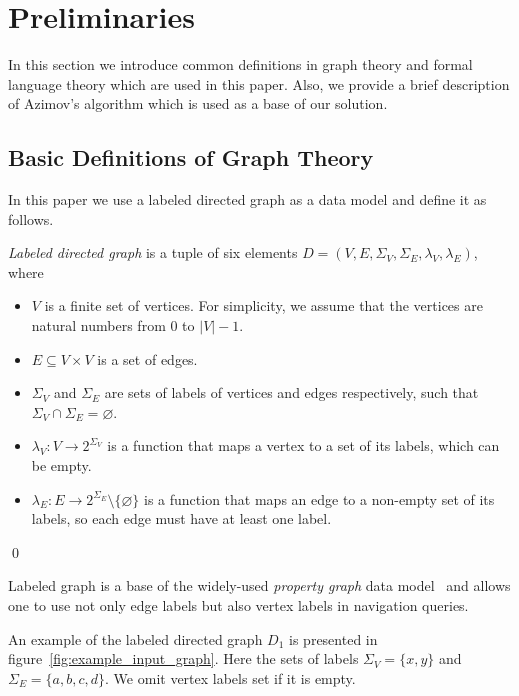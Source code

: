 \section{Preliminaries}

In this section we introduce common definitions in graph theory and formal language theory which are used in this paper.
Also, we provide a brief description of Azimov's algorithm which is used as a base of our solution.

\subsection{Basic Definitions of Graph Theory}

In this paper we use a labeled directed graph as a data model and define it as follows.
\begin{definition} \emph{Labeled directed graph} is a tuple of six elements $D = (V, E, \Sigma_V, \Sigma_E, \lambda_V, \lambda_E)$, where
\begin{itemize}
    \item $V$ is a finite set of vertices. For simplicity, we assume that the vertices are natural numbers from $0$ to $|V|-1$.
    \item $E \subseteq V \times V$ is a set of edges.
    \item $\Sigma_V$ and $\Sigma_E$ are sets of labels of vertices and edges respectively, such that $\Sigma_V \cap \Sigma_E = \varnothing$.
    \item $\lambda_V : V \xrightarrow{} 2^{\Sigma_V}$ is a function that maps a vertex to a set of its labels, which can be empty.
    \item $\lambda_E : E \xrightarrow{} 2^{\Sigma_E} \setminus \{\varnothing\}$ is a function that maps an edge to a non-empty set of its labels, so each edge must have at least one label.
\end{itemize} \qed
\end{definition}

Labeled graph is a base of the widely-used \textit{property graph} data model~\cite{Angles2018ThePG} and allows one to use not only edge labels but also vertex labels in navigation queries.

An example of the labeled directed graph $D_1$ is presented in figure~\ref{fig:example_input_graph}. Here the sets of labels $\Sigma_V = \{x, y\}$ and $\Sigma_E = \{a, b, c, d\}$.
We omit vertex labels set if it is empty.

